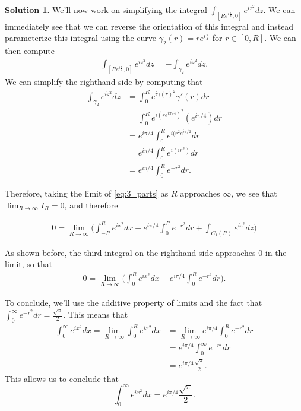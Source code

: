 \documentclass[12pt]{article}
\theoremstyle{definition}
\newtheorem{sol}{Solution}
\theoremstyle{remark}
\begin{document}
\begin{sol}
    We'll now work on simplifying the integral $\int_{[Re^{i\frac{\pi}{4}},0]} e^{iz^2}dz$. We can immediately see that we can reverse the orientation of this integral and instead parameterize this integral using the curve $\gamma_2(r) = re^{i \frac{\pi}{4}}$ for $r\in[0, R]$. We can then compute
    \begin{align}
        \int_{[Re^{i\frac{\pi}{4}},0]} e^{iz^2}dz = -\int_{\gamma_2} e^{iz^2}dz.
    \end{align}
    We can simplify the righthand side by computing that
    \begin{align}
        \int_{\gamma_2} e^{iz^2}dz &= \int_0^R e^{i\gamma(r)^2}\gamma'(r)dr\\
                                    &= \int_0^R e^{i(re^{i\pi/4})^2} (e^{i \pi/4}) dr\\
                                    &=  e^{i \pi/4} \int_0^R e^{i(r^2e^{i\pi/2}} dr \\
                                    &= e^{i \pi/4} \int_0^R e^{i(ir^2)} dr\\
                                    &= e^{i \pi/4} \int_0^R e^{-r^2} dr.
    \end{align}

    Therefore, taking the limit of \ref{eq:3_parts} as $R$ approaches $\infty$, we see that $\lim_{R\to\infty} I_R = 0$, and therefore

\begin{align}
    0 = \lim\limits_{R\to\infty}\Big(\int_{-R}^{R} e^{ix^2}dx -e^{i \pi/4} \int_0^R e^{-r^2} dr +  \int_{C_1(R)}  e^{iz^2}dz \Big)
\end{align}

As shown before, the third integral on the righthand side approaches 0 in the limit, so that
\begin{align}
  0 = \lim\limits_{R\to\infty}\Big(\int_{0}^{R} e^{ix^2}dx -e^{i \pi/4} \int_0^R e^{-r^2} dr \Big).
\end{align}

To conclude, we'll use the additive property of limits and the fact that $\int_0^\infty e^{-r^2} dr = \frac{\sqrt{\pi}}{2}$. This means that
\begin{align}
  \int_{0}^{\infty} e^{ix^2}dx =  \lim\limits_{R\to\infty}\int_{0}^{R} e^{ix^2}dx &=   \lim\limits_{R\to\infty} e^{i \pi/4} \int_0^R e^{-r^2} dr \\
                                                    &= e^{i \pi/4}  \int_0^\infty e^{-r^2} dr \\
                                                    &= e^{i \pi/4}  \frac{\sqrt{\pi}}{2}.
\end{align}
This allows us to conclude that 
\begin{equation}
    \int_{0}^{\infty} e^{ix^2}dx =  e^{i \pi/4}  \frac{\sqrt{\pi}}{2}.
\end{equation}
\end{sol}
\end{document}
